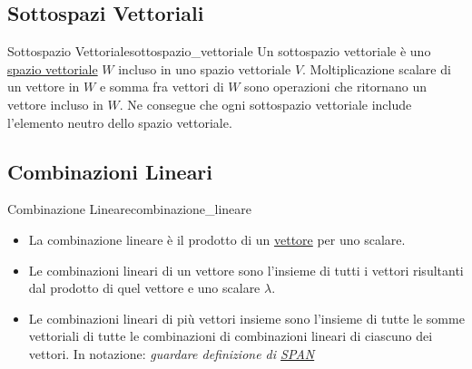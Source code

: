\documentclass{article}
\begin{document}
\subsection{Sottospazi Vettoriali}

\begin{definition}{Sottospazio Vettoriale}{sottospazio_vettoriale}
    Un sottospazio vettoriale è uno \hyperref[def:spazio_vettoriale]{spazio vettoriale} $W$ incluso in uno spazio vettoriale $V$. Moltiplicazione scalare di un vettore in $W$ e somma fra vettori di $W$ sono operazioni che ritornano un vettore incluso in $W$. Ne consegue che ogni sottospazio vettoriale include l'elemento neutro dello spazio vettoriale.
\end{definition}

\subsection{Combinazioni Lineari}

\begin{definition}{Combinazione Lineare}{combinazione_lineare}
    \begin{itemize}
        \item La combinazione lineare è il prodotto di un \hyperref[def:vettore]{vettore} per uno scalare.
        \item Le combinazioni lineari di un vettore sono l'insieme di tutti i vettori risultanti dal prodotto di quel vettore e uno scalare $\lambda$.
        \item Le combinazioni lineari di più vettori insieme sono l'insieme di tutte le somme vettoriali di tutte le combinazioni di combinazioni lineari di ciascuno dei vettori. In notazione: \it{guardare definizione di \hyperref[def:funzione_span]{SPAN}}
    \end{itemize}
\end{definition}
\end{document}
